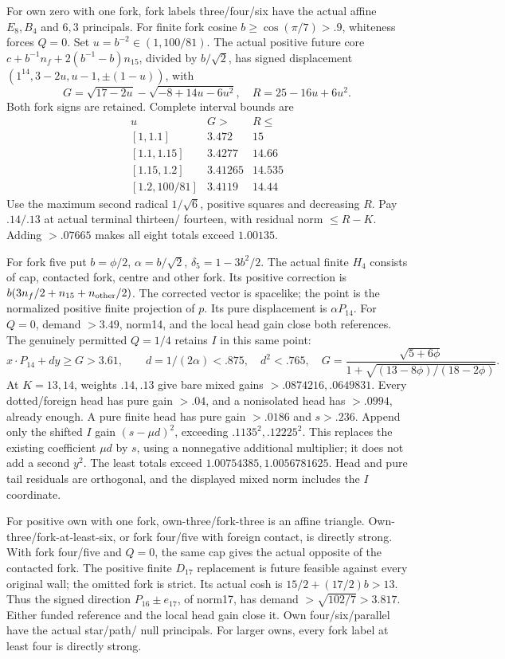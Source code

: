 \documentclass[11pt]{article}
\theoremstyle{definition}
\theoremstyle{remark}
\begin{document}
For own zero with one fork, fork labels three/four/six have the
actual affine \(E_8,B_4\) and \(6,3\) principals. For finite
fork cosine \(b\ge\cos(\pi/7)>.9\), whiteness forces \(Q=0\).
Set \(u=b^{-2}\in(1,100/81)\). The actual positive future core
\(c+b^{-1}n_f+2(b^{-1}-b)n_{15}\), divided by \(b/\sqrt2\),
has signed displacement \((1^{14},3-2u,u-1,\pm(1-u))\), with
\[
 G=\sqrt{17-2u}-\sqrt{-8+14u-6u^2},\quad R=25-16u+6u^2.
\]
Both fork signs are retained. Complete interval bounds are
\[
\begin{array}{c|c|c}
u&G>&R\le\\\hline
{}[1,1.1]&3.472&15\\{}[1.1,1.15]&3.4277&14.66\\
{}[1.15,1.2]&3.41265&14.535\\{}[1.2,100/81]&3.4119&14.44
\end{array}
\]
Use the maximum second radical \(1/\sqrt6\), positive squares and
decreasing \(R\). Pay \(.14/.13\) at actual terminal thirteen/
fourteen, with residual norm \(\le R-K\). Adding \(>.07665\)
makes all eight totals exceed \(1.00135\).

For fork five put \(b=\phi/2\), \(\alpha=b/\sqrt2\),
\(\delta_5=1-3b^2/2\). The actual finite \(H_4\) consists of cap,
contacted fork, centre and other fork. Its positive correction is
\(b(3n_f/2+n_{15}+n_{\rm other}/2)\). The corrected vector is
spacelike; the point is the normalized positive finite projection
of \(p\). Its pure displacement is \(\alpha P_{14}\).
For \(Q=0\), demand \(>3.49\), norm14, and the local head gain
close both references. The genuinely permitted \(Q=1/4\) retains
\(I\) in this same point:
\[
 x\cdot P_{14}+dy\ge G>3.61,\qquad
 d=1/(2\alpha)<.875,\quad d^2<.765,
 \quad G={\frac{\sqrt{5+6\phi}}{1+\sqrt{(13-8\phi)/(18-2\phi)}}}.
\]
At \(K=13,14\), weights \(.14,.13\) give bare mixed gains
\(>.0874216,.0649831\). Every dotted/foreign head has pure gain
\(>.04\), and a nonisolated head has \(>.0994\), already enough.
A pure finite head has pure gain \(>.0186\) and \(s>.236\).
Append only the shifted \(I\) gain \((s-\mu d)^2\), exceeding
\(.1135^2,.12225^2\). This replaces the existing coefficient
\(\mu d\) by \(s\), using a nonnegative additional multiplier;
it does not add a second \(y^2\). The least totals exceed
\(1.00754385,1.0056781625\). Head and pure tail residuals are
orthogonal, and the displayed mixed norm includes the \(I\) coordinate.

For positive own with one fork, own-three/fork-three is an affine
triangle. Own-three/fork-at-least-six, or fork four/five with foreign
contact, is directly strong. With fork four/five and \(Q=0\), the
same cap gives the actual opposite of the contacted fork. The positive
finite \(D_{17}\) replacement is future feasible against every
original wall; the omitted fork is strict. Its actual cosh is
\(15/2+(17/2)b>13\). Thus the signed direction
\(P_{16}\pm e_{17}\), of norm17, has demand
\(>\sqrt{102/7}>3.817\). Either funded reference and the local
head gain close it. Own four/six/parallel have the actual star/path/
null principals. For larger owns, every fork label at least four is
directly strong.
\end{document}
